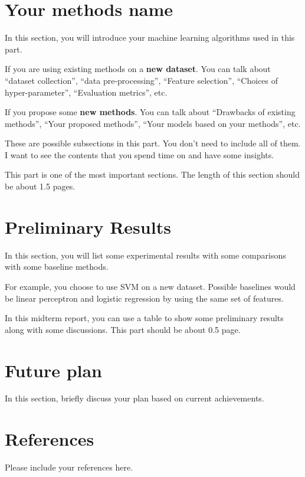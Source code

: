 \documentclass[11pt]{article}
\begin{document}
\section{Your methods name}

In this section, you will introduce your machine learning
algorithms used in this part.

If you are using existing methods on a \textbf{new dataset}. You
can talk about ``dataset collection'', ``data pre-processing'',
``Feature selection'', ``Choices of hyper-parameter'',
``Evaluation metrics'', etc.

If you propose some \textbf{new methods}. You can talk about
``Drawbacks of existing methods'', ``Your proposed methods'',
``Your models based on your methods'', etc.

These are possible subsections in this part. You don't need to
include all of them. I want to see the contents that you spend
time on and have some insights.

This part is one of the most important sections. The length of this
section should be about 1.5 pages.

\section{Preliminary Results}

In this section, you will list some experimental results with
some comparisons with some baseline methods.

For example, you choose to use SVM on a new dataset. Possible
baselines would be linear perceptron and logistic regression by
using the same set of features.

In this midterm report, you can use a table to show some
preliminary results along with some discussions. This part should
be about 0.5 page.

\section{Future plan}

In this section, briefly discuss your plan based on current
achievements.

\section{References}

Please include your references here.
\end{document}
